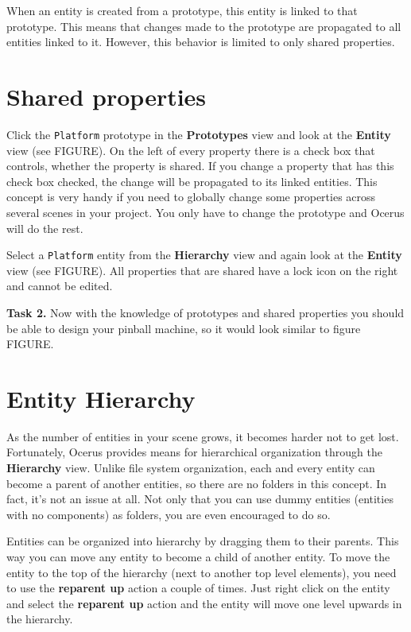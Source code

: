 \documentclass[a4paper,12pt]{article}
\begin{document}
When an entity is created from a prototype, this entity is linked to that prototype. This means that changes made to the prototype are propagated to all entities linked to it. However, this behavior is limited to only shared properties.

\section{Shared properties}
Click the \texttt{Platform} prototype in the \textbf{Prototypes} view and look at the \textbf{Entity} view (see FIGURE). On the left of every property there is a check box that controls, whether the property is shared. If you change a property that has this check box checked, the change will be propagated to its linked entities. This concept is very handy if you need to globally change some properties across several scenes in your project. You only have to change the prototype and Ocerus will do the rest.

Select a \texttt{Platform} entity from the \textbf{Hierarchy} view and again look at the \textbf{Entity} view (see FIGURE). All properties that are shared have a lock icon on the right and cannot be edited.

\textbf{Task 2.} Now with the knowledge of prototypes and shared properties you should be able to design your pinball machine, so it would look similar to figure FIGURE.


\section{Entity Hierarchy}
As the number of entities in your scene grows, it becomes harder not to get lost. Fortunately, Ocerus provides means for hierarchical organization through the \textbf{Hierarchy} view. Unlike file system organization, each and every entity can become a parent of another entities, so there are no folders in this concept. In fact, it's not an issue at all. Not only that you can use dummy entities (entities with no components) as folders, you are even encouraged to do so.

Entities can be organized into hierarchy by dragging them to their parents. This way you can move any entity to become a child of another entity. To move the entity to the top of the hierarchy (next to another top level elements), you need to use the \textbf{reparent up} action a couple of times. Just right click on the entity and select the \textbf{reparent up} action and the entity will move one level upwards in the hierarchy.
\end{document}

